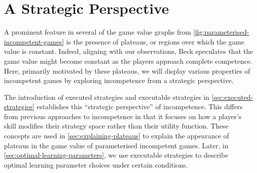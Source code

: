 
\chapter{A Strategic Perspective}  \label{chp:a-strategic-perspective}
    A prominent feature in several of the game value graphs from \autoref{fig:parameterised-incompetent-games} is the presence of plateaus, or regions over which the game value is constant.
    Indeed, aligning with our observations, Beck \parencite{Beck2013} speculates that the game value might become constant as the players approach complete competence.
    Here, primarily motivated by these plateaus, we will display various properties of incompetent games by exploring incompetence from a strategic perspective.

    The introduction of executed strategies and executable strategies in \autoref{sec:executed-strategies} establishes this ``strategic perspective'' of incompetence.
    This differs from previous approaches to incompetence in that it focuses on how a player's skill modifies their strategy space rather than their utility function.
    These concepts are used in \autoref{sec:explaining-plateaus} to explain the appearance of plateaus in the game value of parameterised incompetent games.
    Later, in \autoref{sec:optimal-learning-parameters}, we use executable strategies to describe optimal learning parameter choices under certain conditions.



